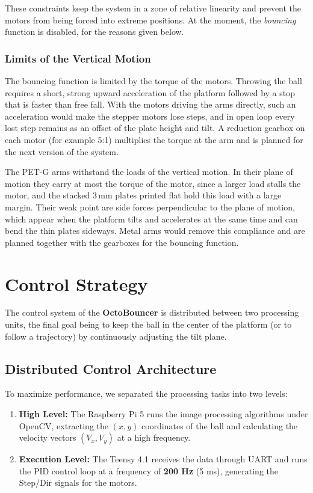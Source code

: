 \documentclass[12pt,a4paper]{report}
\begin{document}
These constraints keep the system in a zone of relative linearity and prevent the motors from being forced into extreme positions. At the moment, the \textit{bouncing} function is disabled, for the reasons given below.

\subsection{Limits of the Vertical Motion}
\label{sec:max_accel}

The bouncing function is limited by the torque of the motors. Throwing the ball requires a short, strong upward acceleration of the platform followed by a stop that is faster than free fall. With the motors driving the arms directly, such an acceleration would make the stepper motors lose steps, and in open loop every lost step remains as an offset of the plate height and tilt. A reduction gearbox on each motor (for example 5:1) multiplies the torque at the arm and is planned for the next version of the system.

The PET-G arms withstand the loads of the vertical motion. In their plane of motion they carry at most the torque of the motor, since a larger load stalls the motor, and the stacked 3\,mm plates printed flat hold this load with a large margin. Their weak point are side forces perpendicular to the plane of motion, which appear when the platform tilts and accelerates at the same time and can bend the thin plates sideways. Metal arms would remove this compliance and are planned together with the gearboxes for the bouncing function.

\chapter{Control Strategy}
\label{chap:control}

The control system of the \textbf{OctoBouncer} is distributed between two processing units, the final goal being to keep the ball in the center of the platform (or to follow a trajectory) by continuously adjusting the tilt plane.

\section{Distributed Control Architecture}
To maximize performance, we separated the processing tasks into two levels:
\begin{enumerate}
    \item \textbf{High Level:} The Raspberry Pi 5 runs the image processing algorithms under OpenCV, extracting the $(x, y)$ coordinates of the ball and calculating the velocity vectors $(V_x, V_y)$ at a high frequency.
    \item \textbf{Execution Level:} The Teensy 4.1 receives the data through UART and runs the PID control loop at a frequency of \textbf{200 Hz} (5 ms), generating the Step/Dir signals for the motors.
\end{enumerate}
\end{document}
